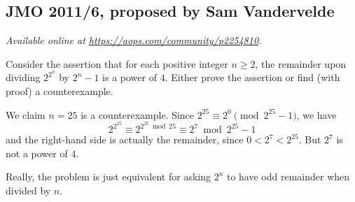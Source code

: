 \documentclass[11pt]{scrartcl}
\begin{document}
\subsection{JMO 2011/6, proposed by Sam Vandervelde}
\textsl{Available online at \url{https://aops.com/community/p2254810}.}
\begin{mdframed}[style=mdpurplebox,frametitle={Problem statement}]
Consider the assertion that for each positive integer $n\geq2$,
the remainder upon dividing $2^{2^n}$ by $2^n-1$ is a power of $4$.
Either prove the assertion or find (with proof) a counterexample.
\end{mdframed}
We claim $n = 25$ is a counterexample.
Since $2^{25} \equiv 2^0 \pmod{2^{25}-1}$, we have
\[ 2^{2^{25}} \equiv 2^{2^{25} \bmod{25}}
  \equiv 2^7 \bmod{2^{25}-1} \]
and the right-hand side is actually the remainder,
since $0 < 2^7 < 2^{25}$.
But $2^7$ is not a power of $4$.

\begin{remark*}
  Really, the problem is just equivalent
  for asking $2^n$ to have odd remainder when divided by $n$.
\end{remark*}
\pagebreak
\end{document}
